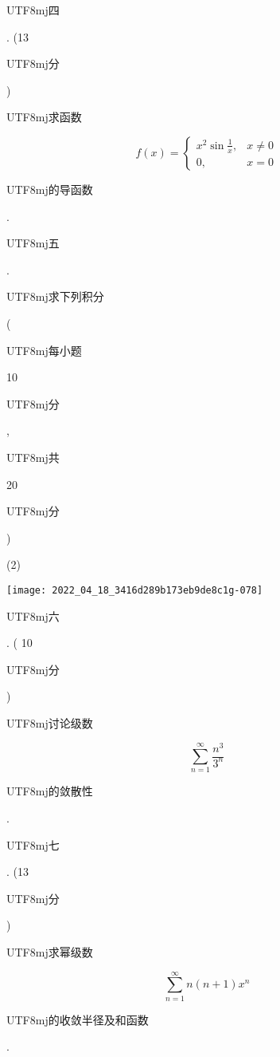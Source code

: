 \documentclass[10pt]{article}
\begin{document}
\begin{CJK}{UTF8}{mj}四\end{CJK}. (13 \begin{CJK}{UTF8}{mj}分\end{CJK}) \begin{CJK}{UTF8}{mj}求函数\end{CJK}
$$
f(x)= \begin{cases}x^{2} \sin \frac{1}{x}, & x \neq 0 \\ 0, & x=0\end{cases}
$$
\begin{CJK}{UTF8}{mj}的导函数\end{CJK}.

\begin{CJK}{UTF8}{mj}五\end{CJK}. \begin{CJK}{UTF8}{mj}求下列积分\end{CJK} (\begin{CJK}{UTF8}{mj}每小题\end{CJK} 10 \begin{CJK}{UTF8}{mj}分\end{CJK}, \begin{CJK}{UTF8}{mj}共\end{CJK} 20 \begin{CJK}{UTF8}{mj}分\end{CJK})

(2)

\texttt{[image: 2022\_04\_18\_3416d289b173eb9de8c1g-078]}

\begin{CJK}{UTF8}{mj}六\end{CJK}. ( 10 \begin{CJK}{UTF8}{mj}分\end{CJK}) \begin{CJK}{UTF8}{mj}讨论级数\end{CJK}
$$
\sum_{n=1}^{\infty} \frac{n^{3}}{3^{n}}
$$
\begin{CJK}{UTF8}{mj}的敛散性\end{CJK}.

\begin{CJK}{UTF8}{mj}七\end{CJK}. (13 \begin{CJK}{UTF8}{mj}分\end{CJK}) \begin{CJK}{UTF8}{mj}求幂级数\end{CJK}
$$
\sum_{n=1}^{\infty} n(n+1) x^{n}
$$
\begin{CJK}{UTF8}{mj}的收敛半径及和函数\end{CJK}.
\end{document}
